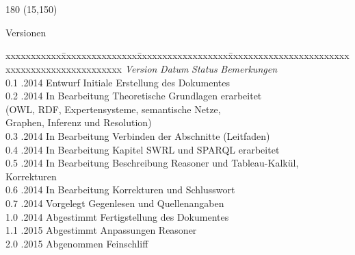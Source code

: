 
\chapter*{}
\label{chap:versionen}

\begin{textblock}{180} (15,150)
\color{black}
\begin{huge}
Versionen
\end{huge}
\vspace{10mm}

\fontsize{10pt}{18pt}\selectfont
\begin{tabbing}
xxxxxxxxxxx\=xxxxxxxxxxxxxxx\=xxxxxxxxxxxxxxxxxx\=xxxxxxxxxxxxxxxxxxxxxxxxxxxxxxxxxxxxxxxxxxxxxxx \kill
\textit{Version}    \> \textit{Datum}   \> \textit{Status}      \> \textit{Bemerkungen}\\
0.1                 .2014       \> Entwurf              \> Initiale Erstellung des Dokumentes\\
0.2                 .2014       \> In Bearbeitung       \> Theoretische Grundlagen erarbeitet \\
                    \>                  \>                      \> (OWL, RDF, Expertensysteme, semantische Netze, \\
                    \>                  \>                      \> Graphen, Inferenz und Resolution)\\
0.3                 .2014       \> In Bearbeitung       \> Verbinden der Abschnitte (Leitfaden)\\
0.4                 .2014       \> In Bearbeitung       \> Kapitel SWRL und SPARQL erarbeitet\\
0.5                 .2014       \> In Bearbeitung       \> Beschreibung Reasoner und Tableau-Kalkül, Korrekturen\\
0.6                 .2014       \> In Bearbeitung       \> Korrekturen und Schlusswort\\
0.7                 .2014       \> Vorgelegt            \> Gegenlesen und Quellenangaben\\
1.0                 .2014       \> Abgestimmt           \> Fertigstellung des Dokumentes\\
1.1                 .2015       \> Abgestimmt           \> Anpassungen Reasoner\\
2.0                 .2015       \> Abgenommen           \> Feinschliff\\
\end{tabbing}

\end{textblock}
